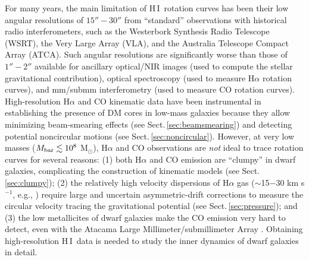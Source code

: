\documentclass[a4paper,11pt]{article}
\newcommand{\hi } {{\rm H}\,{\small\rm I}}
\begin{document}
For many years, the main limitation of \hi\ rotation curves has been their low angular resolutions of $15''-30''$ from ``standard'' observations with historical radio interferometers, such as the Westerbork Synthesis Radio Telescope (WSRT), the Very Large Array (VLA), and the Australia Telescope Compact Array (ATCA). Such angular resolutions are significantly worse than those of $1''-2''$ available for ancillary optical/NIR images (used to compute the stellar gravitational contribution), optical spectroscopy (used to measure H$\alpha$ rotation curves), and mm/submm interferometry (used to measure CO rotation curves). High-resolution H$\alpha$ and CO kinematic data have been instrumental in establishing the presence of DM cores in low-mass galaxies \citep[e.g.,][]{deBlok2002, Simon2003, Simon2005, KuziodeNaray2006} because they allow minimizing beam-smearing effects (see Sect.\,\ref{sec:beamsmearing}) and detecting potential noncircular motions (see Sect.\,\ref{sec:noncircular}). However, at very low masses ($M_{\rm bar} \lesssim 10^8$ M$_\odot$),  H$\alpha$ and CO observations are \emph{not} ideal to trace rotation curves for several reasons: (1) both H$\alpha$ and CO emission are ``clumpy'' in dwarf galaxies, complicating the construction of kinematic models (see Sect.\,\ref{sec:clumpy}); (2) the relatively high velocity dispersions of H$\alpha$ gas ($\sim$15$-$30 km s$^{-1}$, e.g., \citealt{Barat2020}) require large and uncertain asymmetric-drift corrections to measure the circular velocity tracing the gravitational potential (see Sect.\,\ref{sec:pressure}); and (3) the low metallicites of dwarf galaxies make the CO emission very hard to detect, even with the Atacama Large Millimeter/submillimeter Array \citep[ALMA, e.g.,][]{Hunt2023}. Obtaining high-resolution \hi\ data is needed to study the inner dynamics of dwarf galaxies in detail.
\end{document}
